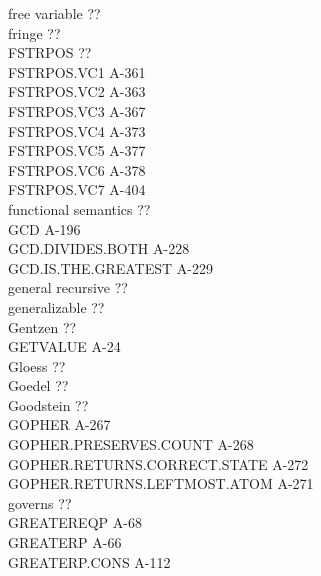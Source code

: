 \documentclass[10pt]{book}
\newenvironment{pubasis}{\begin{flushleft}}{\end{flushleft}}
\begin{document}
\begin{pubasis}
free variable                                ??\\
fringe                                       ??\\
FSTRPOS                                      ??\\
FSTRPOS.VC1                                  A-361\\
FSTRPOS.VC2                                  A-363\\
FSTRPOS.VC3                                  A-367\\
FSTRPOS.VC4                                  A-373\\
FSTRPOS.VC5                                  A-377\\
FSTRPOS.VC6                                  A-378\\
FSTRPOS.VC7                                  A-404\\
functional semantics                         ??\\
GCD                                          A-196\\
GCD.DIVIDES.BOTH                             A-228\\
GCD.IS.THE.GREATEST                          A-229\\
general recursive                            ??\\
generalizable                                ??\\
Gentzen                                      ??\\
GETVALUE                                     A-24\\
Gloess                                       ??\\
Goedel                                       ??\\
Goodstein                                    ??\\
GOPHER                                       A-267\\
GOPHER.PRESERVES.COUNT                       A-268\\
GOPHER.RETURNS.CORRECT.STATE                 A-272\\
GOPHER.RETURNS.LEFTMOST.ATOM                 A-271\\
governs                                      ??\\
GREATEREQP                                   A-68\\
GREATERP                                     A-66\\
GREATERP.CONS                                A-112\\

\end{pubasis}
\end{document}
